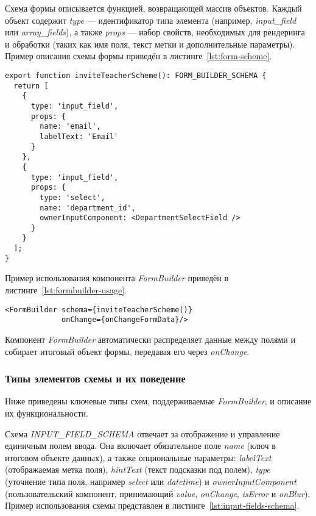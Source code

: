 Схема формы описывается функцией, возвращающей массив объектов. Каждый объект содержит \textit{type} — идентификатор типа элемента (например, \textit{input\_field} или \textit{array\_fields}), а также \textit{props} — набор свойств, необходимых для рендеринга и обработки (таких как имя поля, текст метки и дополнительные параметры). Пример описания схемы формы приведён в листинге~\ref{lst:form-scheme}.

\begin{lstlisting}[caption=Пример описания схемы формы,label=lst:form-scheme]
export function inviteTeacherScheme(): FORM_BUILDER_SCHEMA {
  return [
    {
      type: 'input_field',
      props: {
        name: 'email',
        labelText: 'Email'
      }
    },
    {
      type: 'input_field',
      props: {
        type: 'select',
        name: 'department_id',
        ownerInputComponent: <DepartmentSelectField />
      }
    }
  ];
}
\end{lstlisting}

Пример использования компонента \textit{FormBuilder} приведён в листинге~\ref{lst:formbuilder-usage}.

\begin{lstlisting}[caption=Использование \textit{FormBuilder},label=lst:formbuilder-usage]
<FormBuilder schema={inviteTeacherScheme()} 
			 onChange={onChangeFormData}/>
\end{lstlisting}

Компонент \textit{FormBuilder} автоматически распределяет данные между полями и собирает итоговый объект формы, передавая его через \textit{onChange}.

\subsubsection{Типы элементов схемы и их поведение}
Ниже приведены ключевые типы схем, поддерживаемые \textit{FormBuilder}, и описание их функциональности.

Схема \textit{INPUT\_FIELD\_SCHEMA} отвечает за отображение и управление единичным полем ввода. Она включает обязательное поле \textit{name} (ключ в итоговом объекте данных), а также опциональные параметры: \textit{labelText} (отображаемая метка поля), \textit{hintText} (текст подсказки под полем), \textit{type} (уточнение типа поля, например \textit{select} или \textit{datetime}) и \textit{ownerInputComponent} (пользовательский компонент, принимающий \textit{value}, \textit{onChange}, \textit{isError} и \textit{onBlur}). Пример использования схемы представлен в листинге~\ref{lst:input-fields-schema}.

